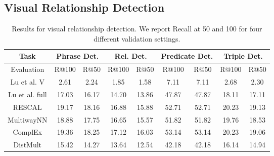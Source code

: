 \documentclass[runningheads,a4paper]{llncs}
\begin{document}
%
%
%

\subsection{Visual Relationship Detection}
\begin{table}[t]
\centering
\caption{Results for visual relationship detection. We report Recall at 50 and 100 for four different validation settings.}
\setlength{\tabcolsep}{0.4em}
{\renewcommand{\arraystretch}{1.4}
\begin{tabular}{|c||c|c||c|c||c|c||c|c|}
\hline
 Task &\multicolumn{2}{c||}{Phrase Det.} &\multicolumn{2}{c||}{Rel. Det.} &\multicolumn{2}{c||}{Predicate Det.} & \multicolumn{2}{c|}{Triple Det.} \\
\hline Evaluation & R@100 & R@50 & R@100 & R@50 & R@100 & R@50 & R@100 & R@50\\
\hline
\hline Lu et al.  V \cite{visual} & 2.61 & 2.24 & 1.85 & 1.58 & 7.11 & 7.11 & 2.68 & 2.30 \\ 
\hline Lu et al. full \cite{visual} & 17.03 & 16.17 & 14.70 & 13.86 & 47.87 & 47.87 & 18.11 &  17.11 \\ 

\hline \hline RESCAL & 19.17  & 18.16  &  16.88  & 15.88  & 52.71  & 52.71 & 20.23 & 19.13  \\
\hline MultiwayNN & 18.88 & 17.75 & 16.65 & 15.57 & 51.82 & 51.82 & 19.76 & 18.53 \\ 
\hline ComplEx & 19.36 & 18.25 & 17.12 & 16.03 & 53.14 & 53.14 & 20.23 & 19.06 \\ %
\hline DistMult & 15.42 & 14.27 & 13.64 & 12.54 & 42.18 & 42.18 & 16.14 & 14.94 \\
\hline 
\end{tabular} 
}
\label{results_main}
\end{table}
\end{document}
